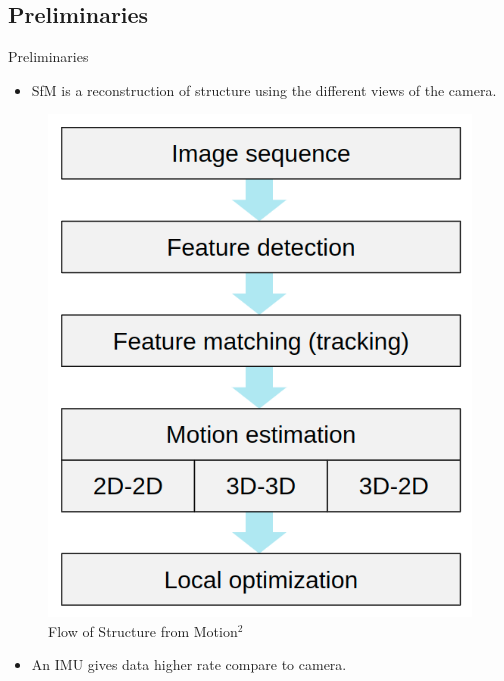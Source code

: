 \documentclass[10pt]{beamer}
\begin{document}
\subsection*{Preliminaries}
\begin{frame}{Preliminaries}
    \begin{minipage}{0.47\textwidth}
        \begin{itemize}
            \item SfM is a reconstruction of structure using the different views of the camera.
        \end{itemize}
        \vspace{-0.2cm}
        \begin{figure}[h!]
            \centering
            \includegraphics[scale=0.22]{Structure_from_motion_flow.png}
            \caption{Flow of Structure from Motion$^2$}
            \label{fig: Sfm_1}
        \end{figure}
    \end{minipage}
    \begin{minipage}{0.47\textwidth}
        \begin{itemize}
            \item An IMU gives data higher rate compare to camera.

\end{itemize}
\end{minipage}
\end{frame}
\end{document}
